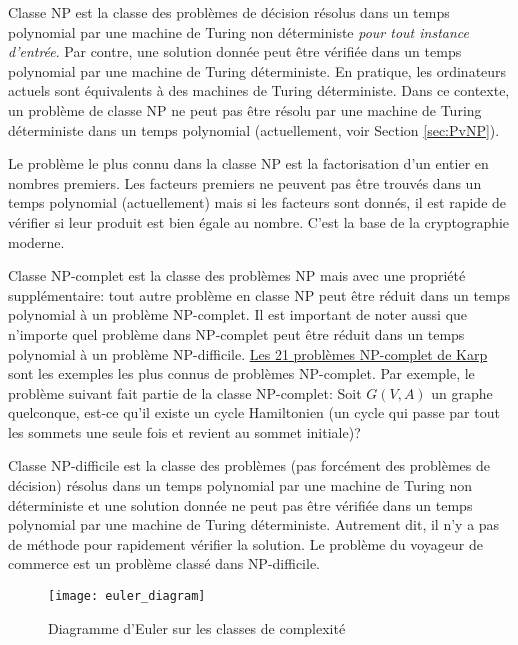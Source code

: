 \documentclass[../main.tex]{subfiles}
\begin{document}
\begin{definition}
Classe NP est la classe des problèmes de décision résolus dans un temps polynomial par une machine de Turing non déterministe \emph{pour tout instance d'entrée}. Par contre, une solution donnée peut être vérifiée dans un temps polynomial par une machine de Turing déterministe. En pratique, les ordinateurs actuels sont équivalents à des machines de Turing déterministe. Dans ce contexte, un problème de classe NP ne peut pas être résolu par une machine de Turing déterministe dans un temps polynomial (actuellement, voir Section \ref{sec:PvNP}).
\end{definition}

Le problème le plus connu dans la classe NP est la factorisation d'un entier en nombres premiers. Les facteurs premiers ne peuvent pas être trouvés dans un temps polynomial (actuellement) mais si les facteurs sont donnés, il est rapide de vérifier si leur produit est bien égale au nombre. C'est la base de la cryptographie moderne.

\begin{definition}
Classe NP-complet est la classe des problèmes NP mais avec une propriété supplémentaire: tout autre problème en classe NP peut être réduit dans un temps polynomial à un problème NP-complet. Il est important de noter aussi que n'importe quel problème dans NP-complet peut être réduit dans un temps polynomial à un problème NP-difficile. \href{https://fr.wikipedia.org/wiki/21_probl\%C3\%A8mes_NP-complets_de_Karp}{Les 21 problèmes NP-complet de Karp} \cite{Karp1972} sont les exemples les plus connus de problèmes NP-complet. Par exemple, le problème suivant fait partie de la classe NP-complet: Soit $G(V, A)$ un graphe quelconque, est-ce qu'il existe un cycle Hamiltonien (un cycle qui passe par tout les sommets une seule fois et revient au sommet initiale)?
\end{definition}

\begin{definition}
Classe NP-difficile est la classe des problèmes (pas forcément des problèmes de décision) résolus dans un temps polynomial par une machine de Turing non déterministe et une solution donnée ne peut pas être vérifiée dans un temps polynomial par une machine de Turing déterministe. Autrement dit, il n'y a pas de méthode pour rapidement vérifier la solution. Le problème du voyageur de commerce est un problème classé dans NP-difficile.
\end{definition}

\begin{figure}[!htb]
    \centering
    \texttt{[image: euler\_diagram]}
    \caption{Diagramme d'Euler sur les classes de complexité}
    \label{fig:euler_diagram}
\end{figure}
\end{document}
